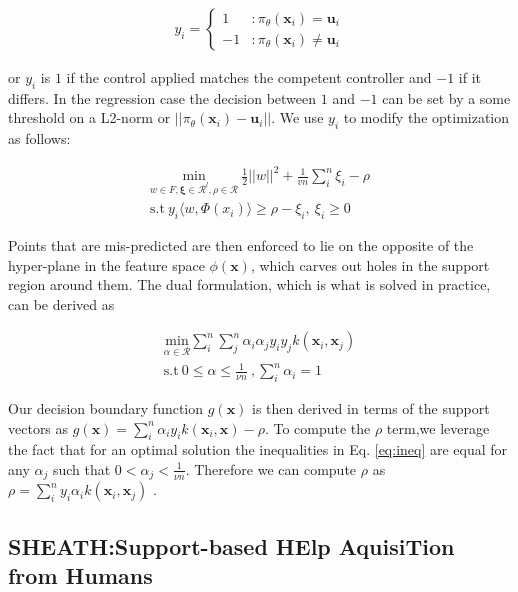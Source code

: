 \documentclass[10pt, conference]{ieeeconf}      %
\newcommand{\bu}{\mathbf{u}}
\newcommand{\bx}{\mathbf{x}}
\newcommand{\mR}{\mathcal{R}}
\begin{document}
\begin{align}
y_i = \left\{
     \begin{array}{lr}
       1 & : \pi_{\theta}(\bx_i) =\bu_i\\
       -1 & : \pi_{\theta}(\bx_i) \neq \bu_i
     \end{array}
   \right.
\end{align}

or $y_i$ is $1$ if the control applied matches the competent controller and $-1$ if it differs. In the regression case the decision between $1$ and $-1$ can be set by a some threshold on a L2-norm or $||\pi_{\theta}(\bx_i)-\bu_i||$. We use $y_i$ to modify the optimization as follows: 

\vspace{-2ex}
\begin{align}\label{eq:primal_sup}
\underset{w\in F, \mathbf{\xi} \in \mR^l, \rho \in \mR}{\mbox{min}}\: \frac{1}{2}||w||^2+\frac{1}{vn} \sum^n_i \xi_i - \rho\\
\mbox{s.t} \: y_i \langle w,\Phi(x_i)\rangle \geq \rho - \xi_i, \: \xi_i \geq 0 \label{eq:ineq}
\end{align}

Points that are mis-predicted are then enforced to lie on the opposite of the hyper-plane in the feature space $\phi(\bx)$, which carves out holes in the support region around them. The dual formulation, which is what is solved in practice, can be derived as 

\vspace{-2ex}
\begin{align}\label{eq:dual_sup}
\underset{\alpha\in \mathcal{R}}{\mbox{min}} \sum_i^n \sum_j^n \alpha_i\alpha_j y_i y_jk(\bx_i,\bx_j)\\
\mbox{s.t} \: 0 \leq \alpha \leq \frac{1}{\nu n} \:, \sum_i^n \alpha_i = 1 
\end{align}

Our decision boundary function $g(\bx)$ is then derived in terms of the support vectors as $g(\bx) = \sum_i^n \alpha_i y_i k(\bx_i,\bx) - \rho$. To compute the $\rho$ term,we leverage the fact that for an optimal solution the inequalities in Eq. \ref{eq:ineq} are equal for any $\alpha_j$ such that $0 < \alpha_j < \frac{1}{\nu n}$. Therefore we can compute $\rho$ as  $\rho = \sum_i^n y_i \alpha_i k(\bx_i,\bx_j)$ \cite{scholkopf2001estimating}. 




\subsection{SHEATH:Support-based HElp AquisiTion from Humans}
\end{document}
